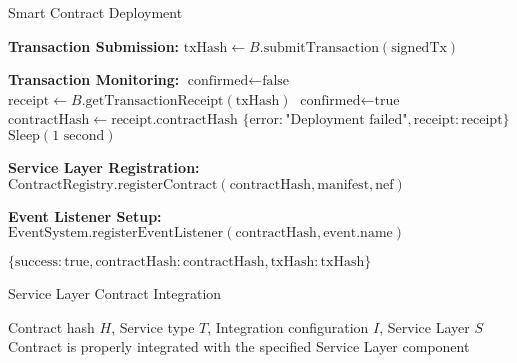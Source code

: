 \begin{tcolorbox}
\begin{tcolorbox}
\begin{protocol}{Smart Contract Deployment}
\begin{algorithmic}[1]
\State \textbf{Transaction Submission:}
\State $\text{txHash} \gets B.\text{submitTransaction}(\text{signedTx})$

\State \textbf{Transaction Monitoring:}
\State $\text{confirmed} \gets \text{false}$
    \State $\text{receipt} \gets B.\text{getTransactionReceipt}(\text{txHash})$
        \State $\text{confirmed} \gets \text{true}$
            \State $\text{contractHash} \gets \text{receipt}.\text{contractHash}$
        \Else
            \State \Return $\{\text{error}: \text{"Deployment failed"}, \text{receipt}: \text{receipt}\}$
        \EndIf
    \EndIf
        \State $\text{Sleep}(1\text{ second})$
    \EndIf
\EndWhile

\State \textbf{Service Layer Registration:}
\State $\text{ContractRegistry}.\text{registerContract}(\text{contractHash}, \text{manifest}, \text{nef})$

\State \textbf{Event Listener Setup:}
    \State $\text{EventSystem}.\text{registerEventListener}(\text{contractHash}, \text{event}.\text{name})$
\EndFor

\State \Return $\{\text{success}: \text{true}, \text{contractHash}: \text{contractHash}, \text{txHash}: \text{txHash}\}$
\end{algorithmic}
\end{protocol}
\end{tcolorbox}


\begin{tcolorbox}[
    enhanced,
    colback=blue!5!white,
    colframe=blue!75!black,
    arc=5mm,
    boxrule=1.5pt,
    title=Smart Contract Protocol,
    fonttitle=\bfseries,
    coltitle=white,
    attach boxed title to top left={yshift=-2mm, xshift=5mm},
    boxed title style={colback=blue!75!black, rounded corners},
    shadow={2mm}{-2mm}{0mm}{black!50},
    drop fuzzy shadow
]
\begin{tcolorbox}[
    enhanced,
    colback=blue!5!white,
    colframe=blue!75!black,
    arc=5mm,
    boxrule=1.5pt,
    title=Protocol,
    fonttitle=\bfseries,
    coltitle=white,
    attach boxed title to top left={yshift=-2mm, xshift=5mm},
    boxed title style={colback=blue!75!black, rounded corners},
    shadow={2mm}{-2mm}{0mm}{black!50},
    drop fuzzy shadow
]
\begin{protocol}{Service Layer Contract Integration}
\label{prot:service-layer-integration}
\begin{algorithmic}[1]
\Require Contract hash $H$, Service type $T$, Integration configuration $I$, Service Layer $S$
\Ensure Contract is properly integrated with the specified Service Layer component


\end{algorithmic}
\end{protocol}
\end{tcolorbox}
\end{tcolorbox}
\end{tcolorbox}
